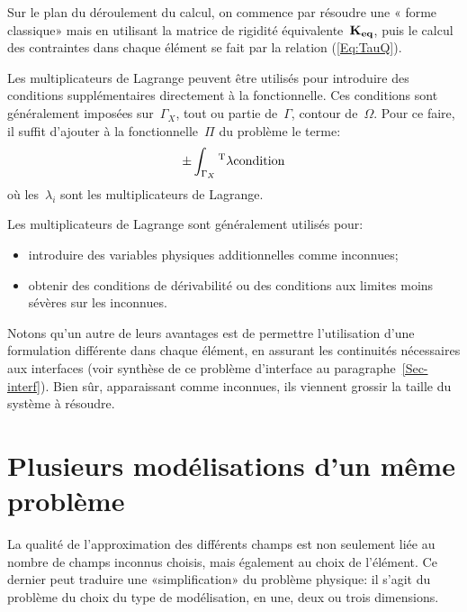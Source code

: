 \medskip
Sur le plan du déroulement du calcul, on commence par résoudre une « forme classique» mais en utilisant la matrice de rigidité équivalente~$\MM{K_{eq}}$, puis le calcul des contraintes dans chaque élément se fait par la relation (\ref{Eq:TauQ}).


\bigskip
Les multiplicateurs de Lagrange peuvent être utilisés pour introduire des conditions supplémentaires directement à la fonctionnelle.
Ces conditions sont généralement imposées sur~$\Gamma_X$, tout ou partie de~$\Gamma$, contour de~$\Omega$. Pour ce faire, il suffit d'ajouter à la fonctionnelle~$\Pi$ du problème le terme:
\begin{equation}
  \pm\dint_{\Gamma_X} \LL{\lambda}\VV{\text{condition}}
\end{equation}
où les~$\lambda_i$ sont les multiplicateurs de Lagrange.

\medskip
Les multiplicateurs de Lagrange sont généralement utilisés pour:
\begin{itemize}
  \item introduire des variables physiques additionnelles comme inconnues;
  \item obtenir des conditions de dérivabilité ou des conditions aux
     limites moins sévères sur les inconnues.
\end{itemize}

\medskip
Notons qu'un autre de leurs avantages est de permettre l'utilisation d'une formulation différente dans chaque élément, en assurant les continuités nécessaires aux interfaces (voir synthèse de ce problème d'interface au paragraphe~\ref{Sec-interf}). Bien sûr, apparaissant comme inconnues, ils viennent grossir la taille du système à résoudre.



\medskip
\section{Plusieurs modélisations d'un même problème}\label{Sec-PlusModel}

La qualité de l'approximation des différents champs est non seulement liée au nombre de champs inconnus choisis, mais également au choix de l'élément. Ce dernier peut traduire une «simplification» du problème physique: il s'agit du problème du choix du type de modélisation, en une, deux ou trois dimensions.

